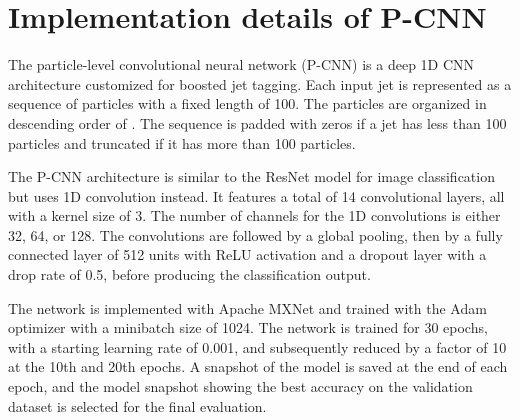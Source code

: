 \documentclass[aps,prd,longbibliography,reprint,amsmath,amssymb,amsfonts]{revtex4-1}
\begin{document}
\section{Implementation details of P-CNN}
\label{app:arch-p-cnn}


The particle-level convolutional neural network (P-CNN) \cite{CMS-DP-2017-049} is a deep 1D CNN architecture customized for boosted jet tagging. Each input jet is represented as a sequence of particles with a fixed length of 100. The particles are organized in descending order of . The sequence is padded with zeros if a jet has less than 100 particles and truncated if it has more than 100 particles. 

The P-CNN architecture is similar to the ResNet model \cite{he2016deep,DBLP:journals/corr/HeZR016} for image classification but uses 1D convolution instead. It features a total of 14 convolutional layers, all with a kernel size of 3. The number of channels for the 1D convolutions is either 32, 64, or 128. The convolutions are followed by a global pooling, then by a fully connected layer of 512 units with ReLU activation and a dropout layer with a drop rate of 0.5, before producing the classification output. 

The network is implemented with Apache MXNet and trained with the Adam optimizer with a minibatch size of 1024. The network is trained for 30 epochs, with a starting learning rate of 0.001, and subsequently reduced by a factor of 10 at the 10th and 20th epochs. A snapshot of the model is saved at the end of each epoch, and the model snapshot showing the best accuracy on the validation dataset is selected for the final evaluation. 
 
\end{document}

